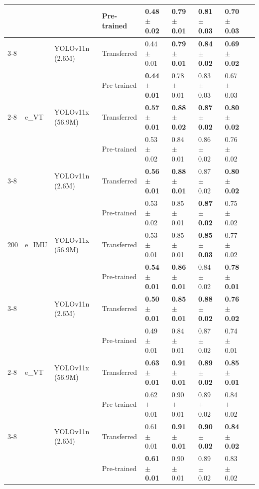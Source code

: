\begin{table}[H]
{\begin{tabular}{lllllllll}
                &        &               & Pre-trained & 0.48 $\pm$ 0.02 & 0.79 $\pm$ 0.01 & 0.81 $\pm$ 0.03 & 0.70 $\pm$ 0.03 \\
            \cmidrule{3-8}
                &        & YOLOv11n (2.6M) & Transferred & 0.44 $\pm$ 0.01 & \textbf{0.79 $\pm$ 0.01} & \textbf{0.84 $\pm$ 0.02} & \textbf{0.69 $\pm$ 0.02} \\
                &        &               & Pre-trained & \textbf{0.44 $\pm$ 0.01} & 0.78 $\pm$ 0.01 & 0.83 $\pm$ 0.03 & 0.67 $\pm$ 0.03 \\
            \cmidrule{2-8}
                & e\_VT  & YOLOv11x (56.9M) & Transferred & \textbf{0.57 $\pm$ 0.01} & \textbf{0.88 $\pm$ 0.02} & \textbf{0.87 $\pm$ 0.02} & \textbf{0.80 $\pm$ 0.02} \\
                &        &               & Pre-trained & 0.53 $\pm$ 0.02 & 0.84 $\pm$ 0.01 & 0.86 $\pm$ 0.02 & 0.76 $\pm$ 0.02 \\
            \cmidrule{3-8}
                &        & YOLOv11n (2.6M) & Transferred & \textbf{0.56 $\pm$ 0.01} & \textbf{0.88 $\pm$ 0.01} & 0.87 $\pm$ 0.02 & \textbf{0.80 $\pm$ 0.02} \\
                &        &               & Pre-trained & 0.53 $\pm$ 0.02 & 0.85 $\pm$ 0.01 & \textbf{0.87 $\pm$ 0.02} & 0.75 $\pm$ 0.02 \\
            \midrule
            200 & e\_IMU & YOLOv11x (56.9M) & Transferred & 0.53 $\pm$ 0.01 & 0.85 $\pm$ 0.01 & \textbf{0.85 $\pm$ 0.03} & 0.77 $\pm$ 0.02 \\
                &        &               & Pre-trained & \textbf{0.54 $\pm$ 0.01} & \textbf{0.86 $\pm$ 0.01} & 0.84 $\pm$ 0.02 & \textbf{0.78 $\pm$ 0.01} \\
            \cmidrule{3-8}
                &        & YOLOv11n (2.6M) & Transferred & \textbf{0.50 $\pm$ 0.01} & \textbf{0.85 $\pm$ 0.01} & \textbf{0.88 $\pm$ 0.02} & \textbf{0.76 $\pm$ 0.02} \\
                &        &               & Pre-trained & 0.49 $\pm$ 0.01 & 0.84 $\pm$ 0.01 & 0.87 $\pm$ 0.02 & 0.74 $\pm$ 0.01 \\
            \cmidrule{2-8}
                & e\_VT  & YOLOv11x (56.9M) & Transferred & \textbf{0.63 $\pm$ 0.01} & \textbf{0.91 $\pm$ 0.01} & \textbf{0.89 $\pm$ 0.02} & \textbf{0.85 $\pm$ 0.01} \\
                &        &               & Pre-trained & 0.62 $\pm$ 0.01 & 0.90 $\pm$ 0.01 & 0.89 $\pm$ 0.02 & 0.84 $\pm$ 0.02 \\
            \cmidrule{3-8}
                &        & YOLOv11n (2.6M) & Transferred & 0.61 $\pm$ 0.01 & \textbf{0.91 $\pm$ 0.01} & \textbf{0.90 $\pm$ 0.02} & \textbf{0.84 $\pm$ 0.02} \\
                &        &               & Pre-trained & \textbf{0.61 $\pm$ 0.01} & 0.90 $\pm$ 0.01 & 0.89 $\pm$ 0.02 & 0.83 $\pm$ 0.02 \\
        \bottomrule
    \end{tabular}
    }
    \label{tab:study3}
\end{table}


